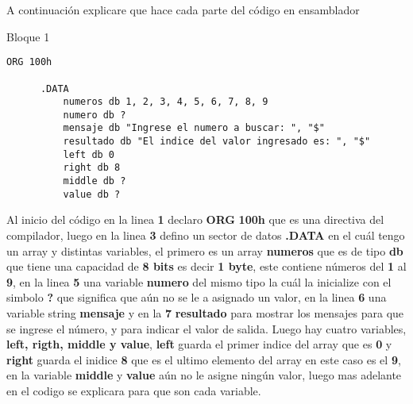 \documentclass[a4paper,twoside]{article}
\newcommand{\codeblue}[1]{\textcolor{codeblue}{#1}}
\begin{document}
    \vspace*{-2cm}
    \begin{center}
      {\Large A continuación explicare que hace cada parte del código en ensamblador}
      \vspace*{2cm}
      
      {\normalsize Bloque 1}
      \begin{lstlisting}[language=8086]
      ORG 100h

      .DATA
          numeros db 1, 2, 3, 4, 5, 6, 7, 8, 9 
          numero db ?
          mensaje db "Ingrese el numero a buscar: ", "$"
          resultado db "El indice del valor ingresado es: ", "$"
          left db 0
          right db 8
          middle db ?
          value db ?
      \end{lstlisting}
    \end{center} 
    \vspace*{1cm}
      {\Large Al inicio del código en la linea \textbf{1} declaro \codeblue{\textbf{ORG}} \textbf{100h} que es una directiva del compilador,
        luego en la linea \textbf{3} defino un sector de datos \codeblue{\textbf{.DATA}} en el cuál tengo un array y distintas variables, 
        el primero es un array \textbf{numeros} que es de tipo \codeblue{\textbf{db}} que tiene una capacidad 
        de \textbf{8 bits} es decir \textbf{1 byte}, este contiene números del \textbf{1} al \textbf{9},
        en la linea \textbf{5} una variable \textbf{numero} del mismo tipo la cuál la inicialize con el simbolo \textbf{?} 
        que significa que aún no se le a asignado un valor, en la linea \textbf{6} una variable string \textbf{mensaje} y en la \textbf{7} 
        \textbf{resultado} para mostrar los mensajes para que se ingrese el número, y para indicar el valor de salida. Luego hay cuatro 
        variables, \textbf{left, rigth, middle y value}, \textbf{left} guarda el primer indice del array que es \textbf{0} 
        y \textbf{right} guarda el inidice \textbf{8} que es el ultimo elemento del array en este caso es el \textbf{9}, en la variable 
        \textbf{middle} y \textbf{value} aún no le asigne ningún valor, luego mas adelante en el codigo se explicara para que son cada variable.
      }   

    \newpage
\end{document}
